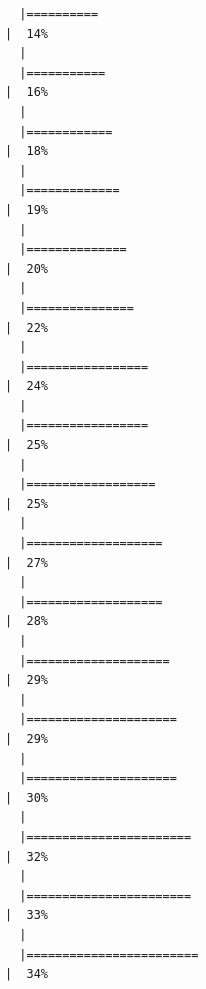 \documentclass[
  letterpaper,
  DIV=11,
  numbers=noendperiod]{scrreprt}
\begin{document}
\begin{verbatim}
  |==========                                                            |  14%
  |                                                                            
  |===========                                                           |  16%
  |                                                                            
  |============                                                          |  18%
  |                                                                            
  |=============                                                         |  19%
  |                                                                            
  |==============                                                        |  20%
  |                                                                            
  |===============                                                       |  22%
  |                                                                            
  |=================                                                     |  24%
  |                                                                            
  |=================                                                     |  25%
  |                                                                            
  |==================                                                    |  25%
  |                                                                            
  |===================                                                   |  27%
  |                                                                            
  |===================                                                   |  28%
  |                                                                            
  |====================                                                  |  29%
  |                                                                            
  |=====================                                                 |  29%
  |                                                                            
  |=====================                                                 |  30%
  |                                                                            
  |=======================                                               |  32%
  |                                                                            
  |=======================                                               |  33%
  |                                                                            
  |========================                                              |  34%

\end{verbatim}
\end{document}
